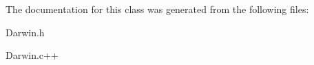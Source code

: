The documentation for this class was generated from the following files\-:\begin{DoxyCompactItemize}
\item 
Darwin.\-h\item 
Darwin.\-c++\end{DoxyCompactItemize}
